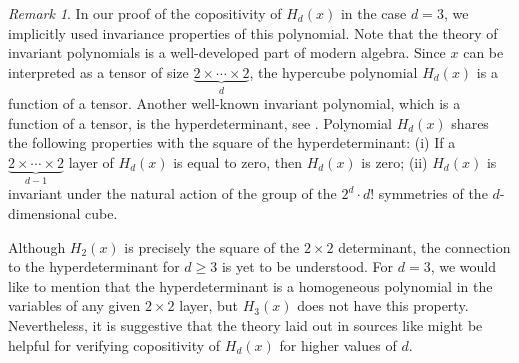 \documentclass[11pt]{amsart}
\newcommand{\R}{\mathbb R}
\theoremstyle{definition}
\theoremstyle{remark}
\newtheorem{rmk}[thm]{Remark}
\begin{document}
\begin{rmk} 
	In our proof of the copositivity of $H_d(x)$ in the case $d=3$, we implicitly used invariance properties of this polynomial. Note that the theory of invariant polynomials is a  well-developed part of modern algebra. Since $x$ can be interpreted as a tensor of size $\underbrace{2 \times \cdots \times 2}_d$, the hypercube polynomial $H_d(x)$ is a function of a tensor. Another well-known invariant polynomial, which is a function of a tensor, is the hyperdeterminant, see \cite{GKZ}. Polynomial $H_d(x)$ shares the following properties with the square of the hyperdeterminant: (i) If a $\underbrace{2 \times \cdots \times 2}_{d-1}$ layer of $H_d(x)$ is equal to zero, then $H_d(x)$ is zero; (ii)  
$H_d(x)$ is invariant under the natural action of the group of the $2^d \cdot d!$ symmetries of the $d$-dimensional cube. 

	Although $H_2(x)$ is precisely the square of the $2 \times 2$ determinant, the connection to the hyperdeterminant for $d \ge 3$  is yet to be understood. For $d=3$, we would like to mention that the hyperdeterminant is a homogeneous polynomial in the variables of any given $2 \times 2$ layer, but $H_3(x)$ does not have this property. Nevertheless, it is suggestive that the theory laid out in sources like \cite{GKZ}  might be helpful for verifying copositivity %
    of $H_d(x)$ for higher values of $d$. 
	
\end{rmk} 
\end{document}
